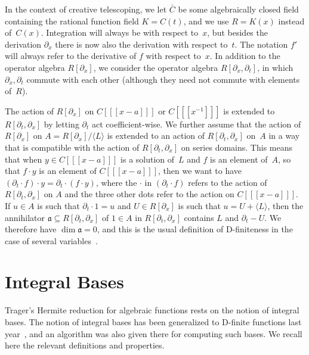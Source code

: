 \documentclass{sig-alternate}
\def\<#1>{\langle#1\rangle}
\begin{document}
In the context of creative telescoping, we let $\bar C$ be some algebraically
closed field containing the rational function field $K=C(t)$, and we
use $R=K(x)$ instead of~$C(x)$. Integration will always be with respect to~$x$, but
besides the derivation $\partial_x$ there is now also the derivation with respect
to~$t$. The notation $f'$ will always refer to the derivative of $f$
with respect to~$x$. In addition to the operator algebra $R[\partial_x]$, we consider the
operator algebra $R[\partial_x,\partial_t]$, in which $\partial_x,\partial_t$
commute with each other (although they need not commute with elements of~$R$).

The action of $R[\partial_x]$ on $C[[[x-a]]]$ or $C[[[x^{-1}]]]$ is extended
to $R[\partial_t,\partial_x]$ by letting $\partial_t$ act coefficient-wise.
We further assume that the action of $R[\partial_x]$ on $A=R[\partial_x]/\<L>$ is
extended to an action of $R[\partial_t,\partial_x]$ on~$A$ in a way that is
compatible with the action of $R[\partial_t,\partial_x]$ on series domains.
This means that when $y\in C[[[x-a]]]$ is a solution of~$L$ and $f$ is an
element of~$A$, so that $f\cdot y$ is an element of $C[[[x-a]]]$, then we
want to have $(\partial_t\cdot f)\cdot y=\partial_t\cdot(f\cdot y)$, where
the $\cdot$ in $(\partial_t\cdot f)$ refers to the action of $R[\partial_t,\partial_x]$
on $A$ and the three other dots refer to the action on $C[[[x-a]]]$.
If $u\in A$ is such that $\partial_t\cdot 1 = u$ and $U\in R[\partial_x]$ is such
that $u=U+\<L>$, then the annihilator $\mathfrak{a}\subseteq R[\partial_t,\partial_x]$
of $1\in A$ in $R[\partial_t,\partial_x]$ contains $L$ and $\partial_t-U$. We
therefore have $\dim\mathfrak{a}=0$, and this is the usual
definition of D-finiteness in the case of several variables~\cite{Zeilberger1990,chyzak98,koutschan09,kauers14c}.

\section{Integral Bases}

Trager's Hermite reduction for algebraic functions rests on the notion of
integral bases. The notion of integral bases has been generalized to D-finite
functions last year~\cite{kauers15b}, and an algorithm was also given there for
computing such bases. We recall here the relevant definitions and properties.
\end{document}
